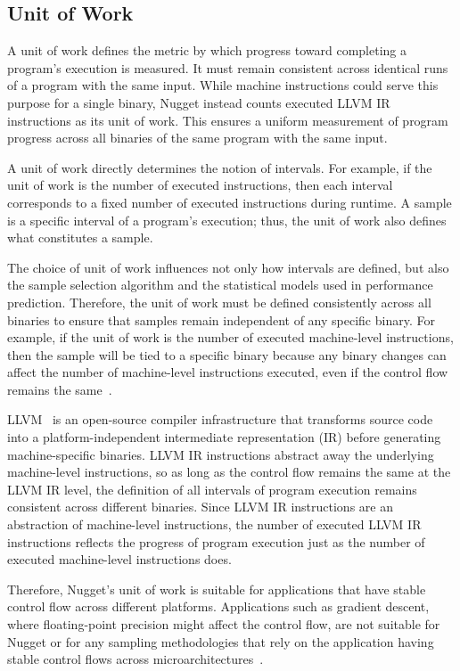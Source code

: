\subsection{Unit of Work}\label{sec:unit_of_work}

A unit of work defines the metric by which progress toward completing a program's execution is measured. 
It must remain consistent across identical runs of a program with the same input. 
While machine instructions could serve this purpose for a single binary, Nugget instead counts executed LLVM IR instructions as its unit of work. 
This ensures a uniform measurement of program progress across all binaries of the same program with the same input.

A unit of work directly determines the notion of intervals. 
For example, if the unit of work is the number of executed instructions, then each interval corresponds to a fixed number of executed instructions during runtime. 
A sample is a specific interval of a program's execution; thus, the unit of work also defines what constitutes a sample.

The choice of unit of work influences not only how intervals are defined, but also the sample selection algorithm and the statistical models used in performance prediction. 
Therefore, the unit of work must be defined consistently across all binaries to ensure that samples remain independent of any specific binary.
For example, if the unit of work is the number of executed machine-level instructions, then the sample will be tied to a specific binary because any binary changes can affect the number of machine-level instructions executed, even if the control flow remains the same~\cite{cross_binary_simpoints}.

LLVM~\cite{llvm} is an open-source compiler infrastructure that transforms source code into a platform-independent intermediate representation (IR) before generating machine-specific binaries.
LLVM IR instructions abstract away the underlying machine-level instructions, so as long as the control flow remains the same at the LLVM IR level, the definition of all intervals of program execution remains consistent across different binaries.
Since LLVM IR instructions are an abstraction of machine-level instructions, the number of executed LLVM IR instructions reflects the progress of program execution just as the number of executed machine-level instructions does.

Therefore, Nugget's unit of work is suitable for applications that have stable control flow across different platforms.
Applications such as gradient descent, where floating-point precision might affect the control flow, are not suitable for Nugget or for any sampling methodologies that rely on the application having stable control flows across microarchitectures~\cite{wavelet-based,simpoint,looppoint,cross_binary_simpoints,pacsim,barrier_point,simpoint-plus,parrot}.
